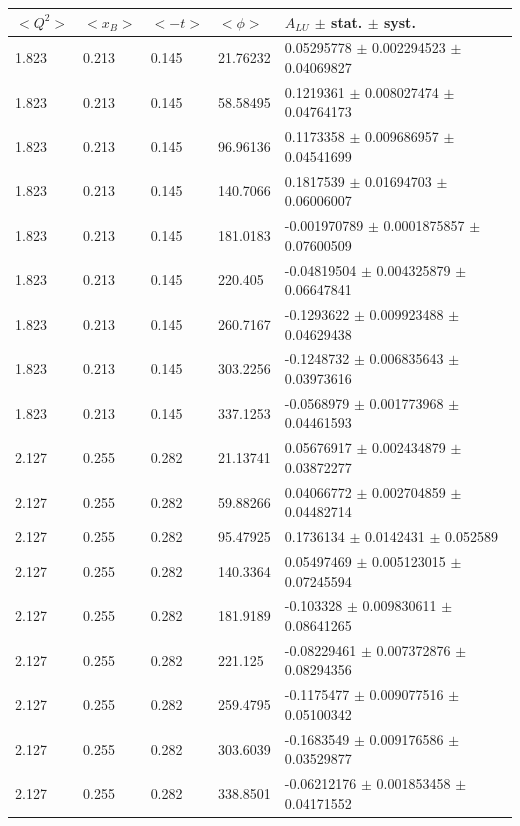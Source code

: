 \begin{table}[!h]
   \begin{center}
      \begin{tabular}{||l|l|l|l|l||}
         \hline
 $<Q^{2}>$ & $<x_{B}>$ & $<-t>$ & $<\phi>$ & $A_{LU}$ $\pm$ stat. $\pm$ syst.\\

         \hline
  1.823 & 0.213 & 0.145 & 21.76232 & 0.05295778   $\pm$  0.002294523  $\pm$  
0.04069827  \\
   1.823 & 0.213 & 0.145 & 58.58495 & 0.1219361    $\pm$  0.008027474  $\pm$  0.04764173  \\
   1.823 & 0.213 & 0.145 & 96.96136 & 0.1173358    $\pm$  0.009686957  $\pm$  0.04541699  \\
   1.823 & 0.213 & 0.145 & 140.7066 & 0.1817539    $\pm$  0.01694703   $\pm$  0.06006007  \\
   1.823 & 0.213 & 0.145 & 181.0183 & -0.001970789 $\pm$  0.0001875857 $\pm$  0.07600509  \\
   1.823 & 0.213 & 0.145 & 220.405  &-0.04819504   $\pm$  0.004325879  $\pm$  0.06647841  \\
   1.823 & 0.213 & 0.145 & 260.7167 & -0.1293622   $\pm$  0.009923488  $\pm$  0.04629438  \\
   1.823 & 0.213 & 0.145 & 303.2256 & -0.1248732   $\pm$  0.006835643  $\pm$  0.03973616  \\
   1.823 & 0.213 & 0.145 & 337.1253 & -0.0568979   $\pm$  0.001773968  $\pm$  0.04461593  \\

         \hline
 2.127 & 0.255 & 0.282  & 21.13741 & 0.05676917  $\pm$   0.002434879  $\pm$  
0.03872277 \\
  2.127 & 0.255 & 0.282  & 59.88266 & 0.04066772  $\pm$   0.002704859  $\pm$  0.04482714 \\
  2.127 & 0.255 & 0.282  & 95.47925 & 0.1736134   $\pm$   0.0142431    $\pm$  0.052589   \\
  2.127 & 0.255 & 0.282  & 140.3364 & 0.05497469  $\pm$   0.005123015  $\pm$  0.07245594 \\
  2.127 & 0.255 & 0.282  & 181.9189 & -0.103328   $\pm$   0.009830611  $\pm$  0.08641265 \\
  2.127 & 0.255 & 0.282  & 221.125  &-0.08229461  $\pm$   0.007372876  $\pm$  0.08294356 \\
  2.127 & 0.255 & 0.282  & 259.4795 & -0.1175477  $\pm$   0.009077516  $\pm$  0.05100342 \\
  2.127 & 0.255 & 0.282  & 303.6039 & -0.1683549  $\pm$   0.009176586  $\pm$  0.03529877 \\
  2.127 & 0.255 & 0.282  & 338.8501 & -0.06212176 $\pm$   0.001853458  $\pm$  0.04171552 \\


\end{tabular}
\end{center}
\end{table}
